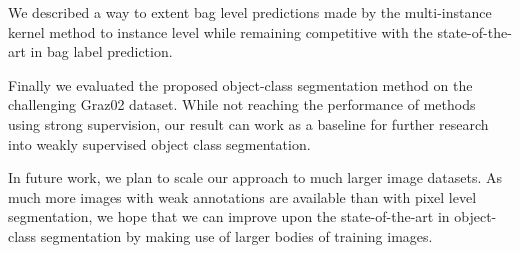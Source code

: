 \documentclass{llncs} %
\begin{document}
We described a way to extent bag level predictions made by the multi-instance
kernel method to instance level while remaining competitive with the state-of-the-art
in bag label prediction.

Finally we evaluated the proposed object-class segmentation method on the challenging
Graz02 dataset. While not reaching the performance of methods using strong supervision,
our result can work as a baseline for further research into weakly supervised object class
segmentation.

In future work, we plan to scale our approach to much larger image datasets. As much
more images with weak annotations are available than with pixel level segmentation,
we hope that we can improve upon the state-of-the-art in object-class segmentation
by making use of larger bodies of training images.


% 
 
 
\end{document}
